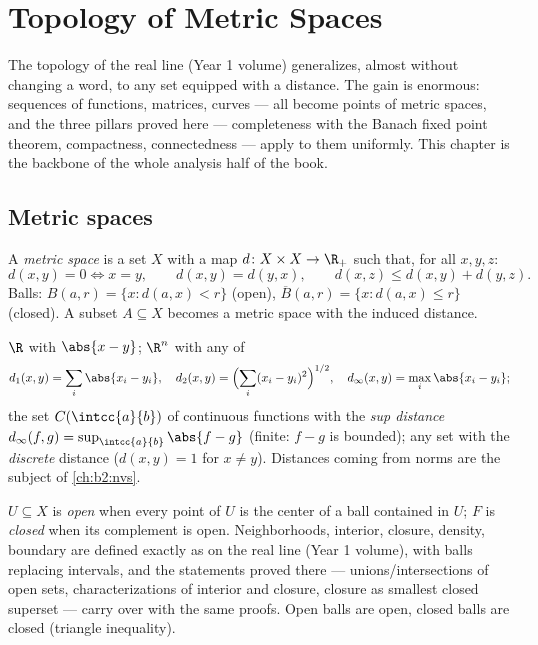 \chapter{Topology of Metric Spaces}\label{ch:b2:metric}

The topology of the real line (Year 1 volume) generalizes, almost
without changing a word, to any set equipped with a distance. The
gain is enormous: sequences of functions, matrices, curves --- all
become points of metric spaces, and the three pillars proved here
--- completeness with the Banach fixed point theorem, compactness,
connectedness --- apply to them uniformly. This chapter is the
backbone of the whole analysis half of the book.

\section{Metric spaces}

\begin{definition}\label{def:b2:metric:def}
A \emph{metric space} is a set $X$ with a map $d
\colon X \times X \to \R_+$ such that, for all $x, y, z$:
\[
d(x,y) = 0 \iff x = y,
\qquad
d(x,y) = d(y,x),
\qquad
d(x,z) \leq d(x,y) + d(y,z).
\]
Balls: $B(a, r) = \{x : d(a,x) < r\}$ (open), $\overline B(a,r) =
\{x : d(a,x) \leq r\}$ (closed). A subset $A \subseteq X$ becomes a
metric space with the induced distance.
\end{definition}

\begin{example}\label{ex:b2:metric:examples}
$\R$ with $\abs{x - y}$; $\R^n$ with any of
\[
d_1(x,y) = \sum_i \abs{x_i - y_i},
\quad
d_2(x,y) = \Bigl(\sum_i (x_i - y_i)^2\Bigr)^{1/2},
\quad
d_\infty(x,y) = \max_i \abs{x_i - y_i};
\]
the set $C(\intcc{a}{b})$ of continuous functions with the
\emph{sup distance} $d_\infty(f, g) = \sup_{\intcc{a}{b}} \abs{f -
g}$ (finite: $f - g$ is bounded); any set with the \emph{discrete}
distance ($d(x,y) = 1$ for $x \neq y$). Distances coming from norms
are the subject of \cref{ch:b2:nvs}.
\end{example}

\begin{definition}\label{def:b2:metric:topology}
$U \subseteq X$ is \emph{open}
when every point of $U$ is the center of a ball contained in $U$;
$F$ is \emph{closed} when its complement is open. Neighborhoods,
interior, closure, density, boundary are defined exactly as on the
real line (Year 1 volume), with balls replacing intervals, and the
statements proved there --- unions/intersections of open sets,
characterizations of interior and closure, closure as smallest
closed superset --- carry over with the same proofs. Open balls are
open, closed balls are closed (triangle inequality).
\end{definition}

